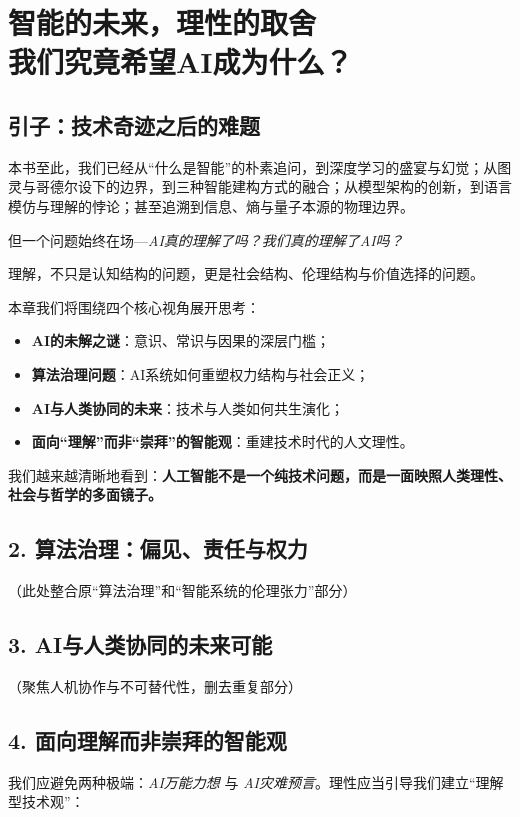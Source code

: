 \chapter{智能的未来，理性的取舍\\\large{}我们究竟希望AI成为什么？}

\section*{引子：技术奇迹之后的难题}
本书至此，我们已经从“什么是智能”的朴素追问，到深度学习的盛宴与幻觉；从图灵与哥德尔设下的边界，到三种智能建构方式的融合；从模型架构的创新，到语言模仿与理解的悖论；甚至追溯到信息、熵与量子本源的物理边界。

但一个问题始终在场---\textit{AI真的理解了吗？我们真的理解了AI吗？}

理解，不只是认知结构的问题，更是社会结构、伦理结构与价值选择的问题。

本章我们将围绕四个核心视角展开思考：

\begin{itemize}
\item \textbf{AI的未解之谜}：意识、常识与因果的深层门槛；
\item \textbf{算法治理问题}：AI系统如何重塑权力结构与社会正义；
\item \textbf{AI与人类协同的未来}：技术与人类如何共生演化；
\item \textbf{面向“理解”而非“崇拜”的智能观}：重建技术时代的人文理性。
\end{itemize}

我们越来越清晰地看到：\textbf{人工智能不是一个纯技术问题，而是一面映照人类理性、社会与哲学的多面镜子。}


\section*{2. 算法治理：偏见、责任与权力}
（此处整合原“算法治理”和“智能系统的伦理张力”部分）

\section*{3. AI与人类协同的未来可能}
（聚焦人机协作与不可替代性，删去重复部分）

\section*{4. 面向理解而非崇拜的智能观}
我们应避免两种极端：\textit{AI万能力想} 与 \textit{AI灾难预言}。理性应当引导我们建立“理解型技术观”：

